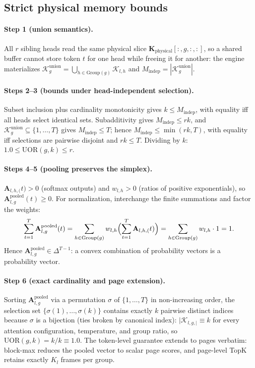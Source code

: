 \documentclass[final,5p,times,twocolumn]{elsarticle}
\theoremstyle{definition}
\theoremstyle{remark}
\newcommand{\Attn}[2]{\mathbf{A}_{#1,#2}}
\newcommand{\AttnPool}[2]{\mathbf{A}^{\mathrm{pooled}}_{#1,#2}}
\newcommand{\UOR}{\mathrm{UOR}}
\newcommand{\Group}[1]{\mathrm{Group}(#1)}
\newcommand{\RetSet}[2]{\mathcal{K}_{#1,#2}}
\newcommand{\TokSet}[1]{\mathcal{K}_{l,#1}}
\begin{document}
\subsection{Strict physical memory bounds}
\label{app:memory}

\paragraph{Step 1 (union semantics).}
All $r$ sibling heads read the same physical slice
 $\mathbf{K}_{\mathrm{physical}}[:,g,:,:]$, so a shared buffer cannot
store token $t$ for one head while freeing it for another: the engine
materializes
 $\mathcal{K}^{\mathrm{union}}_{g} = \bigcup_{h\in\Group{g}}\TokSet{h}$ and $M_{\mathrm{indep}} = |\mathcal{K}^{\mathrm{union}}_{g}|$.

\paragraph{Steps 2--3 (bounds under head-independent selection).}
Subset inclusion plus cardinality monotonicity gives $k \le
M_{\mathrm{indep}}$, with equality iff all heads select identical
sets. Subadditivity gives $M_{\mathrm{indep}} \le rk$, and
 $\mathcal{K}^{\mathrm{union}}_{g} \subseteq \{1,\dots,T\}$ gives
 $M_{\mathrm{indep}} \le T$; hence $M_{\mathrm{indep}} \le \min(rk, T)$,
with equality iff selections are pairwise disjoint and $rk \le T$.
Dividing by $k$: $1.0 \le \UOR(g,k) \le r$.

\paragraph{Steps 4--5 (pooling preserves the simplex).}
 $\Attn{l,h}(t) > 0$ (softmax outputs) and $w_{l,h} > 0$ (ratios of
positive exponentials), so $\AttnPool{l}{g}(t) \ge 0$. For
normalization, interchange the finite summations and factor the
weights:
\[
  \sum_{t=1}^{T}\AttnPool{l}{g}(t)
  = \sum_{h\in\Group{g}} w_{l,h}
    \Bigl(\sum_{t=1}^{T}\Attn{l,h}(t)\Bigr)
  = \sum_{h\in\Group{g}} w_{l,h}\cdot 1 = 1 .
\]
Hence $\AttnPool{l}{g} \in \Delta^{T-1}$: a convex combination of
probability vectors is a probability vector.

\paragraph{Step 6 (exact cardinality and page extension).}
Sorting $\AttnPool{l}{g}$ via a permutation $\sigma$ of
 $\{1,\dots,T\}$ in non-increasing order, the selection set
 $\{\sigma(1),\dots,\sigma(k)\}$ contains exactly $k$ pairwise distinct
indices because $\sigma$ is a bijection (ties broken by canonical
index): $|\RetSet{l,g}| \equiv k$ for every attention configuration,
temperature, and group ratio, so $\UOR(g,k) = k/k \equiv 1.0$. The
token-level guarantee extends to pages verbatim: block-max reduces the
pooled vector to scalar page scores, and page-level TopK retains
exactly $K_l$ frames per group.
\end{document}
